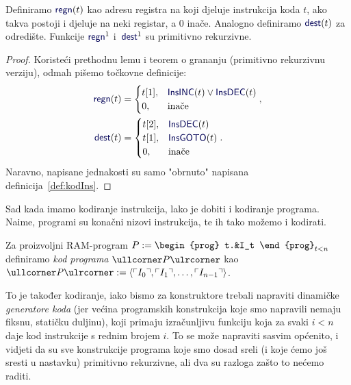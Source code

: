 \begin{lema}\label{lm:regndestprn}
    Definiramo $\f{regn}(t)$ kao adresu registra na koji djeluje instrukcija koda $t$, ako takva postoji i djeluje na neki registar, a $0$ inače. Analogno definiramo $\f{dest}(t)$ za odredište. Funkcije $\f{regn}^1$ i\, $\f{dest}^1$ su primitivno rekurzivne.
\end{lema}
\begin{proof}
Koristeći prethodnu lemu i teorem o grananju (primitivno rekurzivnu verziju), odmah pišemo točkovne definicije:
\begin{align}
    \f{regn}(t)&=\begin{cases}
    t[1],&\f{InsINC}(t)\lor\f{InsDEC}(t)\\
    0,&\text{inače}
    \end{cases}\text,\\
    \f{dest}(t)&=\begin{cases}
    t[2],&\f{InsDEC}(t)\\
    t[1],&\f{InsGOTO}(t)\\
    0,&\text{inače}
    \end{cases}\text.
\end{align}
Naravno, napisane jednakosti su samo "obrnuto" napisana definicija~\ref{def:kodIns}.
\end{proof}


Sad kada imamo kodiranje instrukcija, lako je dobiti i kodiranje programa. Naime, programi su konačni nizovi instrukcija, te ih tako možemo i kodirati.

\begin{definicija}
Za proizvoljni RAM-program
$P:=\begin{prog}
t.&I_t
\end{prog}_{t<n}$
definiramo \emph{kod programa} $\kprog P$ kao
$\kprog P:=\langle\kins{I_0},\kins{I_1},\dotsc,\kins{I_{n-1}}\rangle$.
\end{definicija}

To je također kodiranje, iako bismo za konstruktore trebali napraviti dinamičke \emph{generatore koda} (jer većina programskih konstrukcija koje smo napravili nemaju fiksnu, statičku duljinu), koji primaju izračunljivu funkciju koja za svaki $i<n$ daje kod instrukcije s rednim brojem $i$. To se može napraviti sasvim općenito, i vidjeti da su sve konstrukcije programa koje smo dosad sreli (i koje ćemo još sresti u nastavku) primitivno rekurzivne, ali dva su razloga zašto to nećemo raditi.

